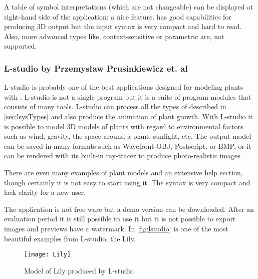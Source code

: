 A table of symbol interpretations (which are not changeable) can be displayed at right-hand side of the application: a nice feature.
 has good capabilities for producing 3D output but the input syntax is very compact and hard to read.
Also, more advanced \lsystem types like, context-sensitive or parametric \lsystems are, not supported.

\newcommand{\lstudio}{\mbox{L-studio}\xspace}

\subsubsection{\lstudio by Przemysław Prusinkiewicz et. al}

\noindent
\lstudio is probably one of the best applications designed for modeling plants with \lsystems.
\lstudio is not a single program but it is a suite of program modules that consists of many tools.
\lstudio can process all the types of \lsystems described in \autoref{sec:lsysTypes} and also produce the animation of plant growth.
With \lstudio it is possible to model 3D models of plants with regard to environmental factors such as wind, gravity, the space around a plant, sunlight, etc.
The output model can be saved in many formats such as Wavefront OBJ, Postscript, or BMP, or it can be rendered with its built-in ray-tracer to produce photo-realistic images.

There are even many examples of plant models and an extensive help section, though certainly it is not easy to start using it.
The syntax is very compact and lack clarity for a new user.

The application is not free-ware but a demo version can be downloaded.
After an evaluation period it is still possible to use it but it is not possible to export images and previews have a watermark.
In \autoref{fig:lstudio} is one of the most beautiful examples from \lstudio, the Lily.


\begin{figure}[h]
	\centering
	\texttt{[image: Lily]}
	\caption{Model of Lily produced by \lstudio}
	\label{fig:lstudio}
\end{figure}





















